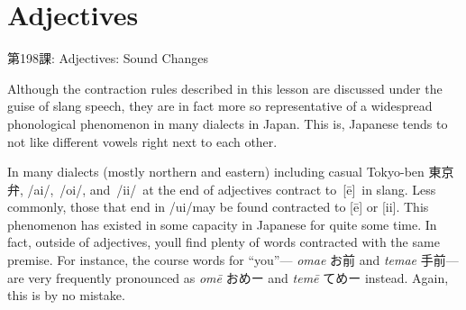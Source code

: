     
\chapter{Adjectives}

\begin{center}
\begin{Large}
第198課: Adjectives: Sound Changes 
\end{Large}
\end{center}
 
\par{ Although the contraction rules described in this lesson are discussed under the guise of slang speech, they are in fact more so representative of a widespread phonological phenomenon in many dialects in Japan. This is, Japanese tends to not like different vowels right next to each other. }

\par{ In many dialects (mostly northern and eastern) including casual Tokyo-ben 東京弁, \slash ai\slash , \slash oi\slash , and \slash ii\slash  at the end of adjectives contract to [ē] in slang. Less commonly, those that end in \slash ui\slash  may be found contracted to [ē] or [ii]. This phenomenon has existed in some capacity in Japanese for quite some time. In fact, outside of adjectives, you\textquotesingle ll find plenty of words contracted with the same premise. For instance, the course words for “you”— \emph{omae }お前 and \emph{temae }手前—are very frequently pronounced as \emph{omē }おめー and \emph{temē }てめー instead. Again, this is by no mistake. }
      
